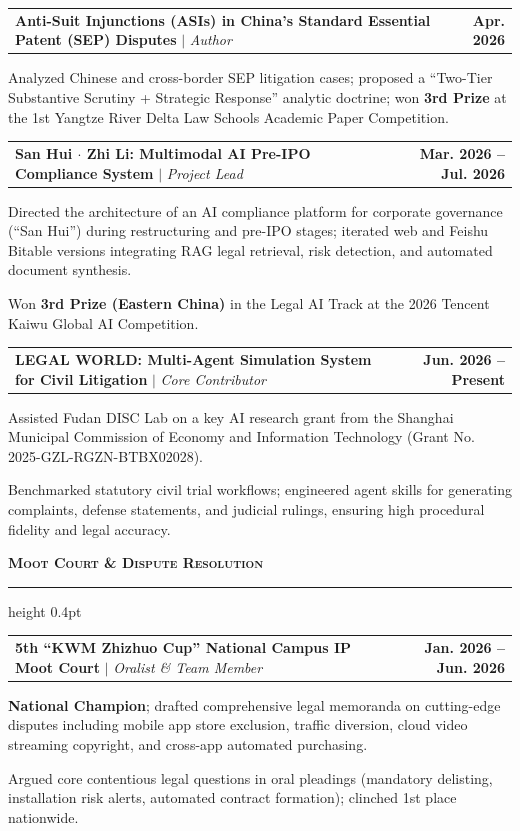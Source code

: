 \documentclass[9.5pt,a4paper]{article}
\makeatletter
\newcommand{\resumesection}[1]{%
  \vspace{3pt}%
  {\normalsize\textbf{\textsc{#1}}}%
  \vspace{1pt}%
  \hrule height 0.4pt%
  \vspace{2pt}%
}
\newenvironment{resumelist}{%
  \begin{list}{\raisebox{0.2ex}{\tiny$\bullet$}}{%
    \setlength{\leftmargin}{11pt}%
    \setlength{\rightmargin}{0pt}%
    \setlength{\labelwidth}{7pt}%
    \setlength{\labelsep}{4pt}%
    \setlength{\itemsep}{0.8pt}%
    \setlength{\parsep}{0pt}%
    \setlength{\topsep}{0.8pt}%
    \setlength{\partopsep}{0pt}%
  }%
}{%
  \end{list}%
  \vspace{0pt}%
}
\newcommand{\resumeProjectHeading}[2]{%
  \noindent\begin{tabularx}{\textwidth}{@{}X r@{}}%
    #1 & \textbf{\footnotesize #2} \\%
  \end{tabularx}%
  \vspace{-3pt}%
}
\makeatother
\begin{document}
\resumeProjectHeading{\textbf{Anti-Suit Injunctions (ASIs) in China's Standard Essential Patent (SEP) Disputes} $\vert$ \textit{Author}}{Apr. 2026}
\begin{resumelist}
  \item Analyzed Chinese and cross-border SEP litigation cases; proposed a ``Two-Tier Substantive Scrutiny + Strategic Response'' analytic doctrine; won \textbf{3rd Prize} at the 1st Yangtze River Delta Law Schools Academic Paper Competition.
\end{resumelist}

\resumeProjectHeading{\textbf{San Hui $\cdot$ Zhi Li: Multimodal AI Pre-IPO Compliance System} $\vert$ \textit{Project Lead}}{Mar. 2026 -- Jul. 2026}
\begin{resumelist}
  \item Directed the architecture of an AI compliance platform for corporate governance (``San Hui'') during restructuring and pre-IPO stages; iterated web and Feishu Bitable versions integrating RAG legal retrieval, risk detection, and automated document synthesis.
  \item Won \textbf{3rd Prize (Eastern China)} in the Legal AI Track at the 2026 Tencent Kaiwu Global AI Competition.
\end{resumelist}

\resumeProjectHeading{\textbf{LEGAL WORLD: Multi-Agent Simulation System for Civil Litigation} $\vert$ \textit{Core Contributor}}{Jun. 2026 -- Present}
\begin{resumelist}
  \item Assisted Fudan DISC Lab on a key AI research grant from the Shanghai Municipal Commission of Economy and Information Technology (Grant No. 2025-GZL-RGZN-BTBX02028).
  \item Benchmarked statutory civil trial workflows; engineered agent skills for generating complaints, defense statements, and judicial rulings, ensuring high procedural fidelity and legal accuracy.
\end{resumelist}

\resumesection{Moot Court \& Dispute Resolution}
\resumeProjectHeading{\textbf{5th ``KWM Zhizhuo Cup'' National Campus IP Moot Court} $\vert$ \textit{Oralist \& Team Member}}{Jan. 2026 -- Jun. 2026}
\begin{resumelist}
  \item \textbf{National Champion}; drafted comprehensive legal memoranda on cutting-edge disputes including mobile app store exclusion, traffic diversion, cloud video streaming copyright, and cross-app automated purchasing.
  \item Argued core contentious legal questions in oral pleadings (mandatory delisting, installation risk alerts, automated contract formation); clinched 1st place nationwide.
\end{resumelist}
\end{document}
